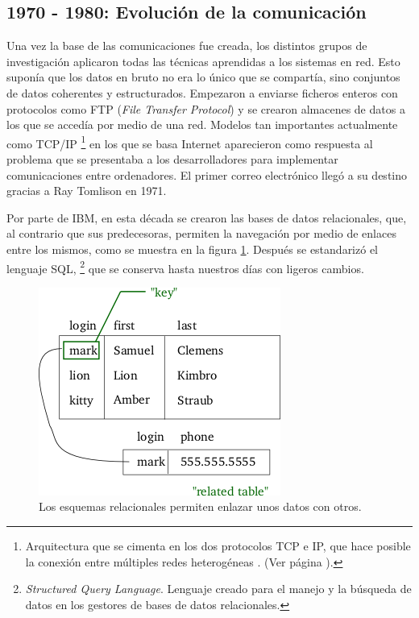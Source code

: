 \subsection{1970 - 1980: Evolución de la comunicación}
\label{subsec:Los70}
Una vez la base de las comunicaciones fue creada, los distintos grupos 
de investigación aplicaron todas las técnicas aprendidas a los 
sistemas en red. Esto suponía que los datos en bruto no era lo único 
que se compartía, sino conjuntos de datos coherentes y estructurados. 
Empezaron a enviarse ficheros enteros con protocolos como FTP 
(\emph{File Transfer Protocol}) y se crearon almacenes de datos a los 
que se accedía por medio de una red. Modelos tan importantes 
actualmente como TCP/IP \footnote{Arquitectura que se cimenta en los 
dos protocolos TCP e IP, que hace posible la conexión entre múltiples 
redes heterogéneas \cite{Tanenbaum}. (Ver página 
\pageref{subsec:tcpip}).} en los que se basa Internet aparecieron como 
respuesta al problema que se presentaba a los desarrolladores para 
implementar comunicaciones entre ordenadores. El primer correo 
electrónico llegó a su destino gracias a Ray Tomlison en 1971.

Por parte de IBM, en esta década se crearon las bases de datos 
relacionales, que, al contrario que sus predecesoras, permiten la 
navegación por medio de enlaces entre los mismos, como se muestra en 
la figura \ref{fig:relationalDB}. Después se estandarizó el lenguaje 
SQL, \footnote{\emph{Structured Query 
Language}. Lenguaje creado para el manejo y la búsqueda de datos en 
los gestores de bases de datos relacionales.} que se conserva hasta 
nuestros días con ligeros cambios.

\begin{figure}[H]
	\centering
	\includegraphics[scale=0.6]{images/relational.png}
	\caption[Esquema relacional de una base de datos]{Los esquemas relacionales permiten enlazar unos datos con otros.}
	\label{fig:relationalDB}
\end{figure}

